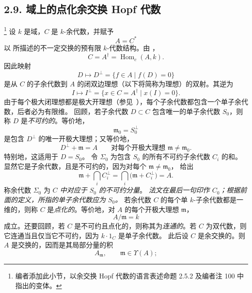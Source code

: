 
\subsection*{2.9. 域上的点化余交换 Hopf 代数}
\label{sga3:VIIB:2.9}
\footnote{\label{sga3:VIIB:nde:118}编者添加此小节，以余交换 Hopf 代数的语言表述命题 2.5.2 及编者注 100 中指出的变体。}
设 \(k\) 是域，\(C\) 是 \(k\)-余代数，并赋予
\[
  A=C^*
\]
以  所描述的不一定交换的预有限 \(k\)-代数结构。由 ，
\[
  C=A^\dagger=\operatorname{Hom}_c(A,k).
\]
因此映射
\[
  D\longmapsto
  D^\perp=\{f\in A\mid f(D)=0\}
\]
是从 \(C\) 的子余代数到 \(A\) 的闭双边理想\textup{（以下将简称为理想）}的双射。其逆为
\[
  I\longmapsto
  I^\perp
  =
  \{x\in C=A^\dagger\mid x(I)=0\}.
\]
由于每个极大闭理想都是极大开理想\textup{（参见\ ）}，每个子余代数都包含一个单子余代数，后者必为有限维。
回顾，若子余代数 \(D\subset C\) 包含唯一的单子余代数 \(S_0\)，则称 \(D\) 是\emph{不可约的}。等价地，
\[
  \mathfrak m_0=S_0^\perp
\]
是包含 \(D^\perp\) 的唯一开极大理想；又等价地，
\[
  D^\perp+\mathfrak m=A
  \qquad
  \text{对每个开极大理想 }
  \mathfrak m\ne\mathfrak m_0.
\]
特别地，这适用于 \(D=S_0\)。
令 \(\Sigma_0\) 为包含 \(S_0\) 的所有不可约子余代数 \(C_i\) 的和。显然它是子余代数，且是不可约的，因为对每个 \(\mathfrak m\ne\mathfrak m_0\)， 给出
\[
  \mathfrak m+\bigcap_i C_i^\perp
  =
  \bigcap_i\bigl(\mathfrak m+C_i^\perp\bigr)
  =
  A.
\]
称余代数 \(\Sigma_0\) 为 \emph{\(C\) 中对应于 \(S_0\) 的不可约分量}。
\textit{法文在最后一句印作 \(C_0\)；根据前面的定义，所指的单子余代数应为 \(S_0\)。}
若余代数 \(C\) 的每个单 \(k\)-子余代数都是一维的，则称 \(C\) 是\emph{点化的}。等价地，对 \(A\) 的每个开极大理想 \(\mathfrak m\)，
\[
  A/\mathfrak m=k
\]
成立。还要回顾，若 \(C\) 是不可约且点化的，则称其为\emph{连通的}。若 \(C\) 为双代数，则它连通当且仅当它不可约，因为 \(k\cdot1_C\) 是单子余代数。
此后设 \(C\) 是余交换的。则 \(A\) 是交换的，因而是其局部分量的积
\[
  A_{\mathfrak m},
  \qquad
  \mathfrak m\in\Upsilon(A);
\]
